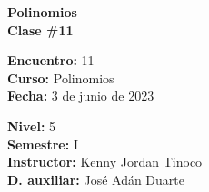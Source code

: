 \begin{center} \textbf
{
    \Large Polinomios \\ \vspace{2mm}Clase \#11
}
\end{center}

\begin{multicols}{2}
{
    \textbf{Encuentro:} 11\\
    \textbf{Curso:} Polinomios\\
    \textbf{Fecha:} 3 de junio de 2023\\
    \begin{flushright}
        \textbf{Nivel:} 5\\
        \textbf{Semestre:} I\\
        \textbf{Instructor:} Kenny Jordan Tinoco\\
        \textbf{D. auxiliar: }José Adán Duarte
    \end{flushright}
}
\end{multicols}

\thispagestyle{first-page-style}